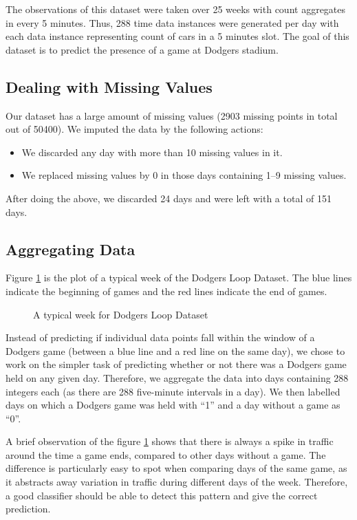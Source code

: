 \documentclass[conference]{IEEEtran}
\begin{document}
The observations of this dataset were taken over 25 weeks with count aggregates in every 5 minutes. Thus, 288 time data instances were generated per day with each data instance representing count of cars in a 5 minutes slot. The goal of this dataset is to predict the presence of a  game at Dodgers stadium. 

\subsection{Dealing with Missing Values}
\label{sec:missing-values}

Our dataset has a large amount of missing values (2903 missing points in total out of 50400). We imputed the data by the following actions:
\begin{itemize}
	\item We discarded any day with more than 10 missing values in it.
	\item We replaced missing values by 0 in those days containing 1--9 missing values.
\end{itemize}
After doing the above, we discarded 24 days and were left with a total of 151 days. 

\subsection{Aggregating Data}

Figure \ref{fig:typical-week} is the plot of a typical week of the Dodgers Loop Dataset. The blue lines indicate the beginning of games and the red lines indicate the end of games. 

\begin{figure}[H]
	\centering
	\caption{A typical week for Dodgers Loop Dataset}
	\label{fig:typical-week}
\end{figure}

Instead of predicting if individual data points fall within the window of a Dodgers game (between a blue line and a red line on the same day), we chose to work on the simpler task of predicting whether or not there was a Dodgers game held on any given day.
Therefore, we aggregate the data into days containing 288 integers each (as there are 288 five-minute intervals in a day). We then labelled days on which a Dodgers game was held with ``1'' and a day without a game as ``0''. 

A brief observation of the figure \ref{fig:typical-week} shows that there is always a spike in traffic around the time a game ends, compared to other days without a game. The difference is particularly easy to spot when comparing days of the same game, as it abstracts away variation in traffic during different days of the week. Therefore, a good classifier should be able to detect this pattern and give the correct prediction.
\end{document}
